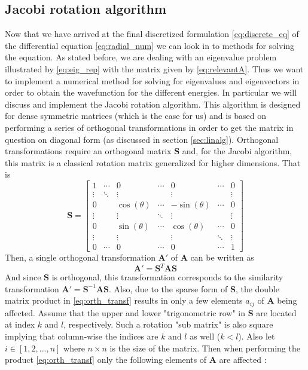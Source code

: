 \documentclass[12pt]{article}
\numberwithin{figure}{section}
\numberwithin{table}{section}
\begin{document}
\subsection{Jacobi rotation algorithm}
Now that we have arrived at the final discretized formulation \eqref{eq:discrete_eq} of the differential equation \eqref{eq:radial_num} we can look in to methods for solving the equation. As stated before, we are dealing with an eigenvalue problem illustrated by \eqref{eq:eig_rep} with the matrix given by \eqref{eq:relevantA}. Thus we want to implement a numerical method for solving for eigenvalues and eigenvectors in order to obtain the wavefunction for the different energies. In particular we will discuss and implement the Jacobi rotation algorithm. This algorithm is designed for dense symmetric matrices (which is the case for us) and is based on performing a series of orthogonal transformations in order to get the matrix in question on diagonal form (as discussed in section \ref{sec:linalg}). Orthogonal transformations require an orthogonal matrix $\mathbf{S}$ and, for the Jacobi algorithm, this matrix is a classical rotation matrix generalized for higher dimensions. That is
\begin{equation}
	\mathbf{S} = \begin{bmatrix}
                           1& \cdots & 0 & \cdots  & 0 & \cdots & 0 \\
                           \vdots & \ddots & \vdots &  & \vdots & & \vdots \\
                           0 &  & \cos(\theta) & \cdots & -\sin(\theta) & \cdots & 0 \\
                           \vdots & & \vdots & \ddots & \vdots & & \vdots \\
                           0 &  & \sin(\theta) & \cdots & \cos(\theta) & \cdots & 0 \\
                           \vdots & & \vdots & & \vdots & \ddots & \vdots \\
                           0 & \cdots & 0 & \cdots  & 0 & \cdots & 1
                      \end{bmatrix} \label{matrixA}
\end{equation}
Then, a single orthogonal transformation $\mathbf{A}'$ of $\mathbf{A}$ can be written as
\begin{equation}
	\mathbf{A}'=\mathbf{S}^T\mathbf{A}\mathbf{S} \label{eq:orth_transf}
\end{equation}
And since $\mathbf{S}$ is orthogonal, this transformation corresponds to the similarity transformation $\mathbf{A}'=\mathbf{S}^{-1}\mathbf{A}\mathbf{S}$. Also, due to the sparse form of $\mathbf{S}$, the double matrix product in \eqref{eq:orth_transf} results in only a few elements $a_{ij}$ of $\mathbf{A}$ being affected. Assume that the upper and lower "trigonometric row" in $\mathbf{S}$ are located at index $k$ and $l$, respectively. Such a rotation "sub matrix" is also square implying that column-wise the indices are $k$ and $l$ as well ($k<l$). Also let $i\in[1,2,...,n]$ where $n\times n$ is the size of the matrix. Then when performing the product \eqref{eq:orth_transf} only the following elements of $\mathbf{A}$ are affected \cite{Comp}:
\end{document}
